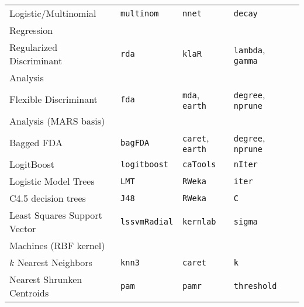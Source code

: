 \documentclass[12pt]{article}
\begin{document}
\begin{longtable}{lllll}
      Logistic/Multinomial  &
         \texttt{multinom} & 
            \texttt{nnet}       & 
            \texttt{decay}& \\   
      \: \: Regression \\ 
                     
      Regularized Discriminant  &
         \texttt{rda} & 
            \texttt{klaR}       & 
            \texttt{lambda}, \texttt{gamma} & \\*
      \: \: Analysis \\*
      
      Flexible Discriminant  &
         \texttt{fda} & 
            \texttt{mda}, \texttt{earth}       & 
            \texttt{degree}, \texttt{nprune} & \\
      \: \: Analysis (MARS basis)\\      
      
      Bagged FDA &
         \texttt{bagFDA} & 
            \texttt{caret},  \texttt{earth}       & 
            \texttt{degree}, \texttt{nprune} \\   
            
 
      LogitBoost &      
         \texttt{logitboost} & 
            \texttt{caTools}       &          
            \texttt{nIter}\\              
            
      Logistic Model Trees &
         \texttt{LMT} & 
            \texttt{RWeka}    & 
            \texttt{iter}  \\  
            
      C4.5 decision trees &
         \texttt{J48} & 
            \texttt{RWeka}    & 
            \texttt{C}  \\  
            
      Least Squares Support Vector  &
         \texttt{lssvmRadial} & 
            \texttt{kernlab}       & 
            \texttt{sigma} \\            
      \:\:  Machines (RBF kernel) & & &\\   
      
                
      $k$ Nearest Neighbors &
         \texttt{knn3} & 
            \texttt{caret}       & 
            \texttt{k} \\   
                  
      Nearest Shrunken Centroids &
         \texttt{pam} & 
            \texttt{pamr}       & 
            \texttt{threshold} \\  
                                                                   

\end{longtable}
\end{document}
